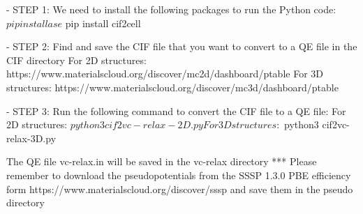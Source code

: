 - STEP 1: We need to install the following packages to run the Python code:
$ pip install ase
$ pip install cif2cell

- STEP 2: Find and save the CIF file that you want to convert to a QE file in the CIF directory
For 2D structures: https://www.materialscloud.org/discover/mc2d/dashboard/ptable
For 3D structures: https://www.materialscloud.org/discover/mc3d/dashboard/ptable

- STEP 3: Run the following command to convert the CIF file to a QE file:
For 2D structures:
$ python3 cif2vc-relax-2D.py
For 3D structures:
$ python3 cif2vc-relax-3D.py 

The QE file vc-relax.in will be saved in the vc-relax directory
*** Please remember to download the pseudopotentials from the SSSP 1.3.0 PBE efficiency form https://www.materialscloud.org/discover/sssp and save them in the pseudo directory